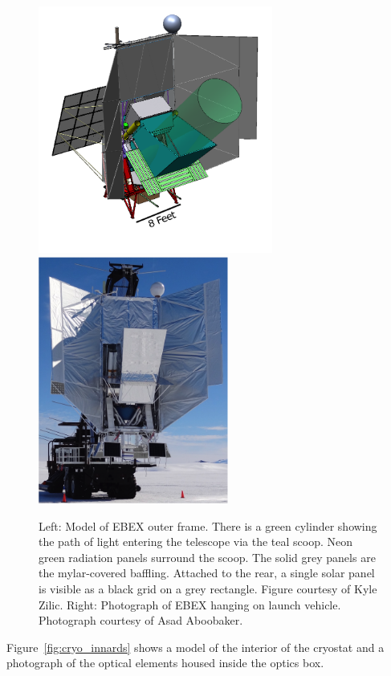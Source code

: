 \begin{figure}[htbp]
\begin{center}
\includegraphics[height=3.2in]{figures/ebex_model.png}
\includegraphics[height=3.2in]{figures/ebex_hanging.png}
\caption[Outer frame, model and photograph]{Left: Model of \ac{EBEX} outer frame. There is a green cylinder showing the path of light entering the telescope via the teal scoop. Neon green radiation panels surround the scoop. The solid grey panels are the mylar-covered baffling. Attached to the rear, a single solar panel is visible as a black grid on a grey rectangle. Figure courtesy of Kyle Zilic. Right: Photograph of \ac{EBEX} hanging on launch vehicle. Photograph courtesy of Asad Aboobaker. 
\label{fig:outer_frame} }
\end{center}
\end{figure}

Figure~\ref{fig:cryo_innards} shows a model of the interior of the cryostat and a photograph of the optical elements housed inside the optics box. 


